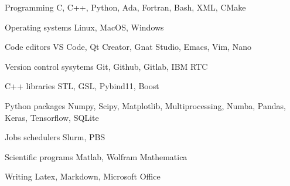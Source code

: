 

\begin{cvskills}

    \cvskill
    {Programming} %
    {C, C++, Python, Ada, Fortran, Bash, XML, CMake} %

    \cvskill
    {Operating systems} %
    {Linux, MacOS, Windows} %

    \cvskill
    {Code editors} %
    {VS Code, Qt Creator, Gnat Studio, Emacs, Vim, Nano} %


    \cvskill
    {Version control sysytems} %
    {Git, Github, Gitlab, IBM RTC} %

    \cvskill
    {C++ libraries} %
    {STL, GSL, Pybind11, Boost}
    

    \cvskill
    {Python packages} %
    {Numpy, Scipy, Matplotlib, Multiprocessing, Numba, Pandas, Keras, Tensorflow, SQLite}

    \cvskill
    {Jobs schedulers} %
    {Slurm, PBS}
    
    \cvskill
    {Scientific programs} %
    {Matlab, Wolfram Mathematica} %

    \cvskill
    {Writing} %
    {Latex, Markdown, Microsoft Office} %

\end{cvskills}